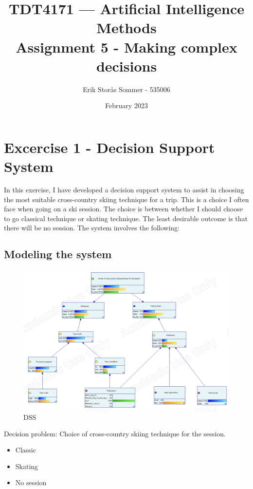 \documentclass{article}
\title{TDT4171 — Artificial Intelligence Methods \\ Assignment 5 - Making complex decisions}
\author{Erik Storås Sommer - 535006}
\date{February 2023}
\begin{document}
\maketitle
\setlength{\parindent}{0pt}

\section*{Excercise 1 - Decision Support System}

In this exercise, I have developed a decision support system to assist in choosing the most suitable cross-country skiing technique for a trip.
This is a choice I often face when going on a ski session.
The choice is between whether I should choose to go classical technique or skating technique. The least desirable outcome is that there will be no session.
The system involves the following:

\subsection*{Modeling the system}

\begin{figure}[hbtp]
    \includegraphics[width=\linewidth]{main_model.png}
    \caption{DSS}
    \label{fig:image1}
\end{figure}

Decision problem: Choice of cross-country skiing technique for the session.
\begin{itemize}
    \item Classic
    \item Skating
    \item No session
\end{itemize}
\end{document}
